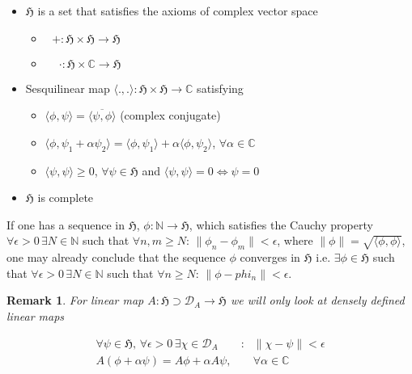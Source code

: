 \documentclass{article}
\newtheorem{remark}{Remark}
\begin{document}
\begin{itemize}
\item $\mathfrak{H}$ is a set that satisfies the axioms of complex vector space

\begin{itemize}
\item $\phantom{\cdot}+:\mathfrak{H}\times\mathfrak{H}\rightarrow\mathfrak{H}$
\item $\phantom{+}\cdot:\mathfrak{H}\times\mathbb{C}\rightarrow\mathfrak{H}$
\end{itemize}

\item Sesquilinear map $\langle.,.\rangle:\mathfrak{H}\times\mathfrak{H}\rightarrow\mathbb{C}$ satisfying

\begin{itemize}
\item $\langle\phi,\psi\rangle = \overline{\langle\psi,\phi\rangle}$ (complex conjugate)
\item $\langle\phi,\psi_1 + \alpha\psi_2\rangle = \langle\phi,\psi_1\rangle + \alpha\langle\phi,\psi_2\rangle$, $\forall \alpha \in \mathbb{C}$
\item $\langle\psi,\psi\rangle \geq 0$, $\forall \psi \in \mathfrak{H}$ and $\langle\psi,\psi\rangle = 0 \Leftrightarrow \psi = 0$
\end{itemize}

\item $\mathfrak{H}$ is complete
\end{itemize}

If one has a sequence in $\mathfrak{H}$, $\phi:\mathbb{N}\rightarrow\mathfrak{H}$, which satisfies the Cauchy property $\forall\epsilon > 0\,\exists N \in \mathbb{N}$ such that $\forall n,m \geq N$: $\|\phi_n - \phi_m\| < \epsilon$, where $\|\phi\| = \sqrt{\langle\phi,\phi\rangle}$, one may already conclude that the sequence $\phi$ converges in $\mathfrak{H}$ i.e. $\exists\phi\in\mathfrak{H}$ such that $\forall\epsilon > 0\,\exists N \in \mathbb{N}$ such that $\forall n \geq N$: $\|\phi - phi_n\| < \epsilon$.

\begin{remark}
For linear map $A:\mathfrak{H} \supset \mathcal{D}_A \rightarrow \mathfrak{H}$ we will only look at densely defined linear maps

\begin{align*}
\forall\psi\in\mathfrak{H}, \,\forall\epsilon > 0 \,\exists \chi\in\mathcal{D}_A &: & \|\chi - \psi\| < \epsilon \\
A(\phi + \alpha\psi) = A\phi + \alpha A\psi, & & \forall \alpha \in \mathbb{C}
\end{align*}

\end{remark}
\end{document}
